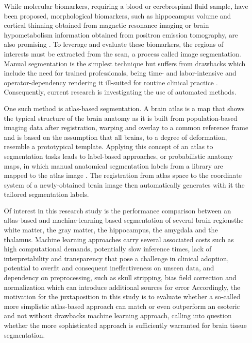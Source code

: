 While molecular biomarkers, requiring a blood or cerebrospinal fluid sample, have been proposed, morphological biomarkers, such as hippocampus volume and cortical thinning obtained from magnetic resonance imaging or brain hypometabolism information obtained from positron emission tomography, are also promising \cite{b4,b5}. To leverage and evaluate these biomarkers, the regions of interests must be extracted from the scan, a process called image segmentation. Manual segmentation is the simplest technique but suffers from drawbacks which include the need for trained professionals, being time- and labor-intensive and operator-dependency rendering it ill-suited for routine clinical practice \cite{b6}. Consequently, current research is investigating the use of automated methods.

One such method is atlas-based segmentation. A brain atlas is a map that shows the typical structure of the brain anatomy as it is built from population-based imaging data after registration, warping and overlay to a common reference frame and is based on the assumption that all brains, to a degree of deformation, resemble a prototypical template. Applying this concept of an atlas to segmentation tasks leads to label-based approaches, or probabilistic anatomy maps, in which manual anatomical segmentation labels from a library are mapped to the atlas image \cite{b7}. The registration from atlas space to the coordinate system of a newly-obtained brain image then automatically generates with it the tailored segmentation labels.

Of interest in this research study is the performance comparison between an altas-based and machine-learning based segmentation of several brain regions\textemdash{}the white matter, the gray matter, the hippocampus, the amygdala and the thalamus. Machine learning approaches carry several associated costs such as high computational demands, potentially slow inference times, lack of interpretability and transparency that pose a challenge in clinical adoption, potential to overfit and consequent ineffectiveness on unseen data, and dependency on preprocessing, such as skull stripping, bias field correction and normalization which can introduce additional sources for error \cite{b8,b9} Accordingly, the motivation for the juxtaposition in this study is to evaluate whether a so-called more simplistic atlas-based approach can match or even outperform an esoteric and not without drawbacks machine learning approach, calling into question whether the more sophisticated approach is sufficiently warranted for brain tissue segmentation.



















